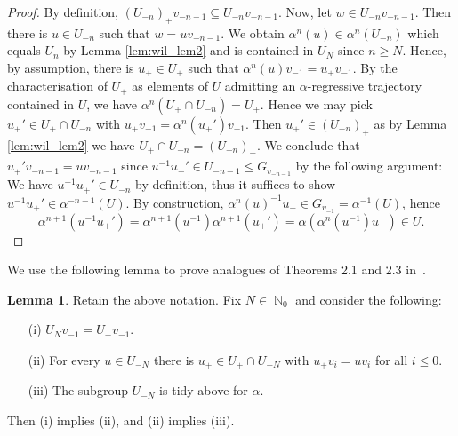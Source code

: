 \documentclass{article}
\DeclareMathOperator\bbN{\mathbb{N}}
\theoremstyle{definition}
\newtheorem{lemma}[theorem]{Lemma}
\begin{document}
\begin{proof}
By definition, $(U_{-n})_{+}v_{-n-1}\subseteq U_{-n}v_{-n-1}$. Now, let $w\in U_{-n}v_{-n-1}$. Then there is $u\in U_{-n}$ such that $w=uv_{-n-1}$. We obtain $\alpha^{n}(u)\in\alpha^{n}(U_{-n})$ which equals $U_{n}$ by Lemma \ref{lem:wil_lem2} and is contained in $U_{N}$ since $n\ge N$. Hence, by assumption, there is $u_{+}\in U_{+}$ such that $\alpha^{n}(u)v_{-1}=u_{+}v_{-1}$. By the characterisation of $U_+$ as elements of $U$ admitting an $\alpha$-regressive trajectory contained in $U$, we have $\alpha^n(U_+\cap U_{-n}) = U_+$. Hence we may pick $u_{+}'\in U_{+}\cap U_{-n}$ with $u_{+}v_{-1}=\alpha^{n}(u_{+}')v_{-1}$. Then $u_{+}'\in (U_{-n})_{+}$ as by Lemma \ref{lem:wil_lem2} we have $U_{+}\cap U_{-n}=(U_{-n})_{+}$. We conclude that $u_{+}'v_{-n-1}=uv_{-n-1}$ since $u^{-1}u_{+}'\in U_{-n-1}\le G_{v_{-n-1}}$ by the following argument: We have $u^{-1}u_{+}'\in U_{-n}$ by definition, thus it suffices to show $u^{-1}u_{+}'\in\alpha^{-n-1}(U)$. By construction, $\alpha^{n}(u)^{-1}u_{+}\in G_{v_{-1}}=\alpha^{-1}(U)$, hence
\begin{displaymath}
\alpha^{n+1}(u^{-1}u_{+}')=\alpha^{n+1}(u^{-1})\alpha^{n+1}(u_{+}')=\alpha(\alpha^{n}(u^{-1})u_{+})\in U.
\end{displaymath}
\end{proof}

We use the following lemma to prove analogues of Theorems 2.1 and 2.3 in~\cite{Moe02}.

\begin{lemma}\label{lem:moe_thm2.3_end}
Retain the above notation. Fix $N\in\bbN_0$ and consider the following:
\begin{itemize}
  \item[(i)] $U_{N}v_{-1}=U_{+}v_{-1}$.
  \item[(ii)] For every $u\in U_{-N}$ there is $u_{+}\in U_{+}\cap U_{-N}$ with $u_{+}v_{i}=uv_{i}$ for all $i\le 0$.
  \item[(iii)] The subgroup $U_{-N}$ is tidy above for $\alpha$.
\end{itemize}
Then (i) implies (ii), and (ii) implies (iii).
\end{lemma}
\end{document}
